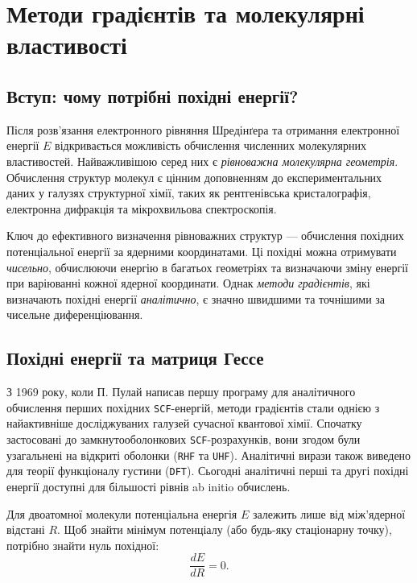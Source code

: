 \documentclass{PySCFBook}
\begin{document}
\chapter{Методи градієнтів та молекулярні властивості}\label{GradientMethods}

\section{Вступ: чому потрібні похідні енергії?}

Після розв’язання електронного рівняння Шредінґера та отримання електронної енергії $E$ відкривається можливість обчислення численних молекулярних властивостей. Найважливішою серед них є \emph{рівноважна молекулярна геометрія}. Обчислення структур молекул є цінним доповненням до експериментальних даних у галузях структурної хімії, таких як рентгенівська кристалографія, електронна дифракція та мікрохвильова спектроскопія.

Ключ до ефективного визначення рівноважних структур --- обчислення похідних потенціальної енергії за ядерними координатами. Ці похідні можна отримувати \emph{чисельно}, обчислюючи енергію в багатьох геометріях та визначаючи зміну енергії при варіюванні кожної ядерної координати. Однак \emph{методи градієнтів}, які визначають похідні енергії \emph{аналітично}, є значно швидшими та точнішими за чисельне диференціювання.

\section{Похідні енергії та матриця Гессе}

З 1969 року, коли П. Пулай написав першу програму для аналітичного обчислення перших похідних \texttt{SCF}-енергій, методи градієнтів стали однією з найактивніше досліджуваних галузей сучасної квантової хімії. Спочатку застосовані до замкнутооболонкових \texttt{SCF}-розрахунків, вони згодом були узагальнені на відкриті оболонки (\texttt{RHF} та \texttt{UHF}). Аналітичні вирази також виведено для теорії функціоналу густини (\texttt{DFT}). Сьогодні аналітичні перші та другі похідні енергії доступні для більшості рівнів ab initio обчислень.

Для двоатомної молекули потенціальна енергія $E$ залежить лише від між’ядерної відстані $R$. Щоб знайти мінімум потенціалу (або будь-яку стаціонарну точку), потрібно знайти нуль похідної:
\begin{equation*}
\frac{dE}{dR} = 0.
\end{equation*}
\end{document}
